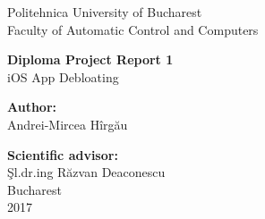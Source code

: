 \thispagestyle{empty}
\begin{center}
\large
Politehnica University of Bucharest \\
Faculty of Automatic Control and Computers \\

{\LARGE
	\textbf{Diploma Project Report 1}\\
}
\vspace{0.5cm}
{\LARGE
	{iOS App Debloating}
}

\vspace{3cm}
\textbf{Author:}\\
Andrei-Mircea Hîrgău

\bigskip
\bigskip

\textbf{Scientific advisor:}\\
Şl.dr.ing Răzvan Deaconescu\\

Bucharest\\
2017 \\
\vspace*{1cm}
\end{center}
